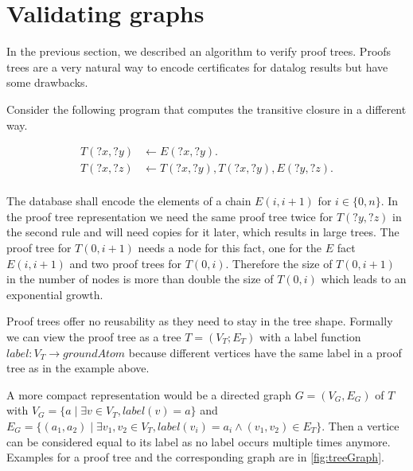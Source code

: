 \section{Validating graphs}\label{sec:valGraph}

In the previous section, we described an algorithm to verify proof trees. Proofs trees are a very natural way to encode certificates for datalog results but have some drawbacks. 

\begin{example}\label{ex:treeGraph}
    Consider the following program that computes the transitive closure in a different way.

    \begin{equation}
        \begin{split}
            T(?x,?y) &\leftarrow E(?x,?y). \\
            T(?x,?z) &\leftarrow T(?x, ?y), T(?x, ?y), E(?y, ?z). \\
        \end{split}
    \end{equation}

    The database shall encode the elements of a chain $E(i, i+1)$ for $i \in \{0, n\}$. In the proof tree representation we need the same proof tree twice for $T(?y, ?z)$ in the second rule and will need copies for it later, which results in large trees. The proof tree for $T(0, i+1)$ needs a node for this fact, one for the $E$ fact $E(i, i+1)$ and two proof trees for $T(0, i)$. Therefore the size of $T(0, i+1)$ in the number of nodes is more than double the size of $T(0, i)$ which leads to an exponential growth.
\end{example}

Proof trees offer no reusability as they need to stay in the tree shape. Formally we can view the proof tree as a tree $T= (V_T;E_T)$ with a label function $label: V_T \to groundAtom$ because different vertices have the same label in a proof tree as in the example above.

A more compact representation would be a directed graph $G=(V_G, E_G)$ of $T$  with $V_G = \{a \mid \exists v \in V_T, label(v)=a\}$ and $E_G = \{ (a_1, a_2) \mid \exists v_1, v_2 \in V_T,  label(v_i) = a_i \land (v_1, v_2) \in E_T\}$. Then a vertice can be considered equal to its label as no label occurs multiple times anymore. Examples for a proof tree and the corresponding graph are in \cref{fig:treeGraph}.


